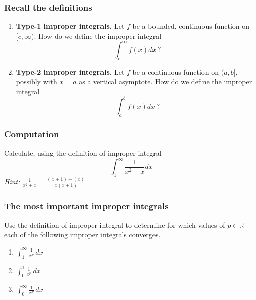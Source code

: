 \documentclass[14pt]{beamer}
\date{}
\title{}
\author{}
\begin{document}





	\begin{frame}[t]
		\frametitle{Recall the definitions}

		\begin{enumerate}
			\item {\bfseries Type-1 improper integrals.} Let $f$ be a bounded,
				continuous function on $\displaystyle [c, \infty)$. How do we define the
				improper integral
				\[
					\int_{c}^{\infty}f(x) dx \, ?
				\]

				\vfill

			\item {\bfseries Type-2 improper integrals.} Let $f$ be a continuous function
				on $\displaystyle (a,b]$, possibly with $x=a$ as a vertical asymptote. How
				do we define the improper integral
				\[
					\int_{a}^{b}f(x) dx \, ?
				\]

				\vfill
		\end{enumerate}
	\end{frame}


	\begin{frame}[t]
		\frametitle{Computation}

		Calculate, using the definition of improper integral
		\[
			\int_{1}^{\infty}\frac{1}{x^{2}+x}dx
		\]
		\emph{Hint:} $\displaystyle \frac{1}{x^{2}+x}= \frac{(x+1) - (x)}{x(x+1)}$
	\end{frame}

	\begin{frame}[t]
		\frametitle{The most important improper integrals}

		Use the definition of improper integral to determine for which values of
		$\displaystyle p \in \mathbb{R}$ each of the following improper integrals
		converges.

		\begin{enumerate}
			\item $\displaystyle \int_{1}^{\infty}\frac{1}{x^{p}}\, dx$
				\vfill

			\item $\displaystyle \int_{0}^{1}\frac{1}{x^{p}}\, dx$
				\vfill

			\item $\displaystyle \int_{0}^{\infty}\frac{1}{x^{p}}\, dx$
				\vfill
		\end{enumerate}
	\end{frame}
\end{document}
